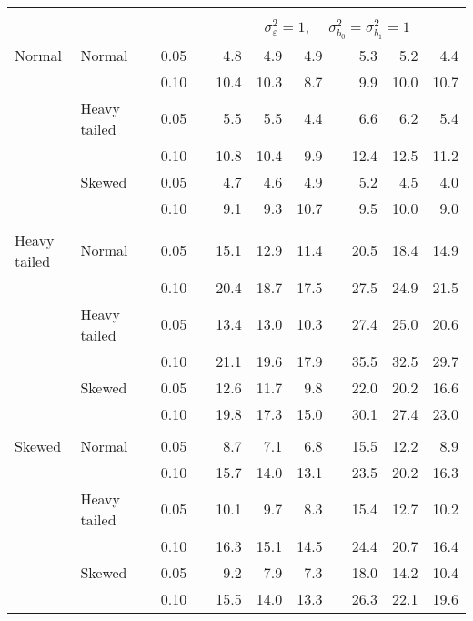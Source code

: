 \begin{table}[ht]
\begin{scriptsize}
\begin{tabular}{ll p{.1cm} c p{.1cm} rrr p{.1cm} rrr}
&&&&&&&&&&&\\
& && && \multicolumn{7}{c}{$\sigma_{\varepsilon}^2 = 1$, \ \ $\sigma_{b_0}^2 = \sigma_{b_1}^2 = 1$} \\ \cline{6-12}
\rowcolor{gray!20} Normal & Normal &  & 0.05 &  & 4.8 & 4.9 & 4.9 &  & 5.3 & 5.2 & 4.4 \\ 
\rowcolor{gray!20}    &  &  & 0.10 &  & 10.4 & 10.3 & 8.7 &  & 9.9 & 10.0 & 10.7 \\ 
\rowcolor{gray!20}    & Heavy tailed &  & 0.05 &  & 5.5 & 5.5 & 4.4 &  & 6.6 & 6.2 & 5.4 \\ 
\rowcolor{gray!20}    &  &  & 0.10 &  & 10.8 & 10.4 & 9.9 &  & 12.4 & 12.5 & 11.2 \\ 
\rowcolor{gray!20}    & Skewed &  & 0.05 &  & 4.7 & 4.6 & 4.9 &  & 5.2 & 4.5 & 4.0 \\ 
\rowcolor{gray!20}    &  &  & 0.10 &  & 9.1 & 9.3 & 10.7 &  & 9.5 & 10.0 & 9.0 \\ 
&&&&&&&&&&&\\
  Heavy tailed & Normal &  & 0.05 &  & 15.1 & 12.9 & 11.4 &  & 20.5 & 18.4 & 14.9 \\ 
   &  &  & 0.10 &  & 20.4 & 18.7 & 17.5 &  & 27.5 & 24.9 & 21.5 \\ 
   & Heavy tailed &  & 0.05 &  & 13.4 & 13.0 & 10.3 &  & 27.4 & 25.0 & 20.6 \\ 
   &  &  & 0.10 &  & 21.1 & 19.6 & 17.9 &  & 35.5 & 32.5 & 29.7 \\ 
   & Skewed &  & 0.05 &  & 12.6 & 11.7 & 9.8 &  & 22.0 & 20.2 & 16.6 \\ 
   &  &  & 0.10 &  & 19.8 & 17.3 & 15.0 &  & 30.1 & 27.4 & 23.0 \\ 
&&&&&&&&&&&\\
  Skewed & Normal &  & 0.05 &  & 8.7 & 7.1 & 6.8 &  & 15.5 & 12.2 & 8.9 \\ 
   &  &  & 0.10 &  & 15.7 & 14.0 & 13.1 &  & 23.5 & 20.2 & 16.3 \\ 
   & Heavy tailed &  & 0.05 &  & 10.1 & 9.7 & 8.3 &  & 15.4 & 12.7 & 10.2 \\ 
   &  &  & 0.10 &  & 16.3 & 15.1 & 14.5 &  & 24.4 & 20.7 & 16.4 \\ 
   & Skewed &  & 0.05 &  & 9.2 & 7.9 & 7.3 &  & 18.0 & 14.2 & 10.4 \\ 
   &  &  & 0.10 &  & 15.5 & 14.0 & 13.3 &  & 26.3 & 22.1 & 19.6 \\ 


\end{tabular}
\end{scriptsize}
\end{table}
